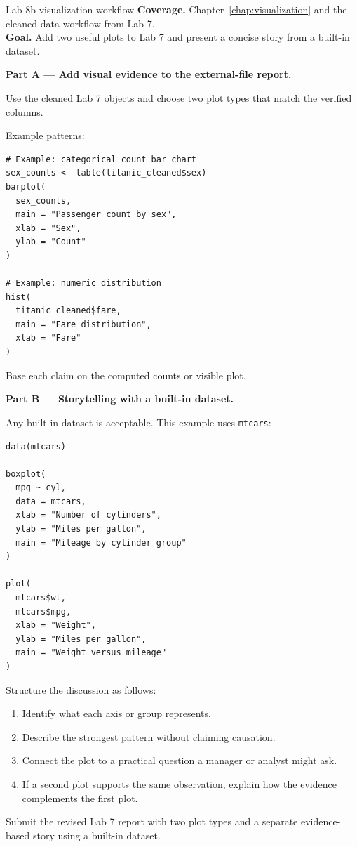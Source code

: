 
\begin{labproject}{Lab 8b visualization workflow}
\textbf{Coverage.} Chapter~\ref{chap:visualization} and the cleaned-data workflow from Lab 7.\\
\textbf{Goal.} Add two useful plots to Lab 7 and present a concise story from a built-in dataset.

\textbf{Part A --- Add visual evidence to the external-file report.}

Use the cleaned Lab 7 objects and choose two plot types that match the verified columns.

Example patterns:

\begin{lstlisting}[style=dsr]
# Example: categorical count bar chart
sex_counts <- table(titanic_cleaned$sex)
barplot(
  sex_counts,
  main = "Passenger count by sex",
  xlab = "Sex",
  ylab = "Count"
)

# Example: numeric distribution
hist(
  titanic_cleaned$fare,
  main = "Fare distribution",
  xlab = "Fare"
)
\end{lstlisting}

Base each claim on the computed counts or visible plot.

\textbf{Part B --- Storytelling with a built-in dataset.}

Any built-in dataset is acceptable. This example uses \texttt{mtcars}:

\begin{lstlisting}[style=dsr]
data(mtcars)

boxplot(
  mpg ~ cyl,
  data = mtcars,
  xlab = "Number of cylinders",
  ylab = "Miles per gallon",
  main = "Mileage by cylinder group"
)

plot(
  mtcars$wt,
  mtcars$mpg,
  xlab = "Weight",
  ylab = "Miles per gallon",
  main = "Weight versus mileage"
)
\end{lstlisting}

Structure the discussion as follows:
\begin{enumerate}
  \item Identify what each axis or group represents.
  \item Describe the strongest pattern without claiming causation.
  \item Connect the plot to a practical question a manager or analyst might ask.
  \item If a second plot supports the same observation, explain how the evidence complements the first plot.
\end{enumerate}
\end{labproject}

\begin{labdeliverable}
Submit the revised Lab 7 report with two plot types and a separate evidence-based story using a built-in dataset.
\end{labdeliverable}
